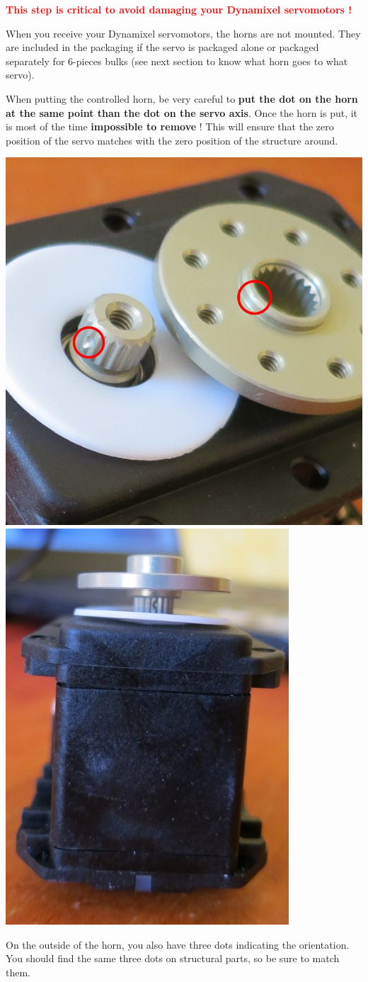 \documentclass{article}
\begin{document}
\textcolor{red}{\textbf{This step is critical to avoid damaging your Dynamixel servomotors !}}

When you receive your Dynamixel servomotors, the horns are not mounted. They are included in the packaging if the servo is packaged alone or packaged separately for 6-pieces bulks (see next section to know what horn goes to what servo).

When putting the controlled horn, be very careful to \textbf{put the dot on the horn at the same point than the dot on the servo axis}. Once the horn is put, it is most of the time \textbf{impossible to remove} ! This will ensure that the zero position of the servo matches with the zero position of the structure around.

 \begin{center}
  \includegraphics[height=0.55\textwidth]{img/zero}
  \includegraphics[height=0.55\textwidth]{img/zero2}
 \end{center}

On the outside of the horn, you also have three dots indicating the orientation. You should find the same three dots on structural parts, so be sure to match them.
\end{document}

